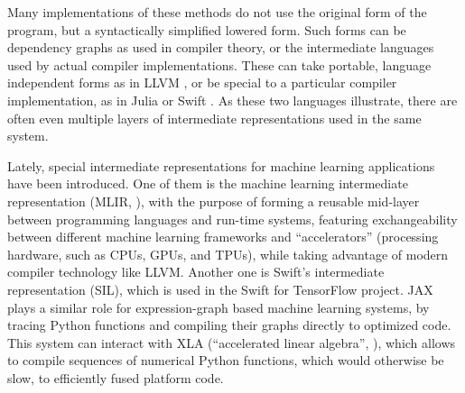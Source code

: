 Many implementations of these methods do not use the original form of the program, but a
syntactically simplified lowered form.  Such forms can be dependency graphs as used in compiler
theory, or the intermediate languages used by actual compiler implementations.  These can take
portable, language independent forms as in LLVM \parencite{llvmproject2019llvm}, or be special to a
particular compiler implementation, as in Julia \parencite{bezanson2017julia} or Swift
\parencite{apple2020swifta}.  As these two languages illustrate, there are often even multiple
layers of intermediate representations used in the same system.

Lately, special intermediate representations for machine learning applications have been introduced.
One of them is the machine learning intermediate representation (MLIR, \textcite{lattner2020mlir}),
with the purpose of forming a reusable mid-layer between programming languages and run-time systems,
featuring exchangeability between different machine learning frameworks and \enquote{accelerators}
(processing hardware, such as CPUs, GPUs, and TPUs), while taking advantage of modern compiler
technology like LLVM.  Another one is Swift's intermediate representation (SIL), which is used in
the Swift for TensorFlow project.  JAX \parencite{bradbury2018jax} plays a similar role for
expression-graph based machine learning systems, by tracing Python functions and compiling their
graphs directly to optimized code.  This system can interact with XLA (\enquote{accelerated linear
  algebra}, \textcite{tensorflowdevelopers2020xla}), which allows to compile sequences of numerical
Python functions, which would otherwise be slow, to efficiently fused platform code.


